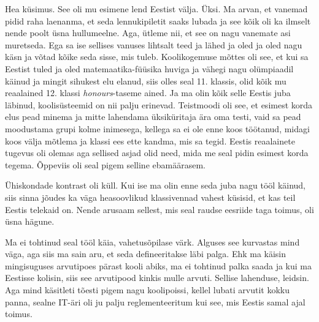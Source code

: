 Hea küsimus. See oli mu esimene lend Eestist välja. Üksi. Ma arvan, et vanemad 
pidid raha laenanma, et seda lennukipiletit saaks lubada ja see kõik oli ka 
ilmselt nende poolt üsna hullumeelne. Aga, ütleme nii, et see on nagu vanemate 
asi muretseda.  Ega sa ise sellises vanuses lihtsalt teed ja lähed ja oled ja 
oled nagu käsn ja võtad kõike seda sisse, mis tuleb. Koolikogemuse mõttes oli 
see, et kui sa Eestist tuled ja oled  matemaatika-füüsika huviga ja 
vähegi nagu olümpiaadil käinud ja mingit sihukest elu elanud, siis olles seal 
11. klassis, olid kõik mu reaalained 12. klassi \emph{honours}-taseme ained. Ja 
ma olin kõik selle Eestis juba läbinud, koolisüsteemid on nii palju erinevad. 
Teistmoodi oli see, et  esimest korda elus pead minema ja mitte lahendama 
üksiküritaja ära oma testi, vaid  sa pead moodustama grupi kolme inimesega, 
kellega sa ei ole enne koos töötanud, midagi koos välja mõtlema ja klassi ees 
ette kandma, mis sa tegid. Eestis reaalainete tugevus oli olemas aga sellised 
asjad olid need, mida  me seal pidin esimest korda tegema. Õppeviis oli seal 
pigem selline ebamäärasem. 

Ühiskondade kontrast oli küll. Kui ise ma olin enne seda juba nagu tööl käinud, 
siis sinna jõudes ka väga heasoovlikud klassivennad vahest küsisid, et kas teil 
Eestis telekaid on. Nende arusaam sellest, mis seal raudse eesriide taga  
toimus, oli üsna hägune. 


Ma ei tohtinud seal tööl käia, vahetusõpilase värk. Alguses see kurvastas mind 
väga, aga siis ma sain aru, et seda defineeritakse läbi palga. Ehk ma käisin 
mingisuguses arvutipoes pärast kooli abiks, ma ei tohtinud palka saada ja kui 
ma Eestisse kolisin, siis see arvutipood kinkis mulle arvuti. Sellise 
lahenduse, leidsin. Aga mind käsitleti tõesti pigem nagu 
koolipoissi, kellel lubati arvutit kokku panna, sealne IT-äri oli ju palju 
reglementeeritum kui see, mis  Eestis samal ajal toimus. 

